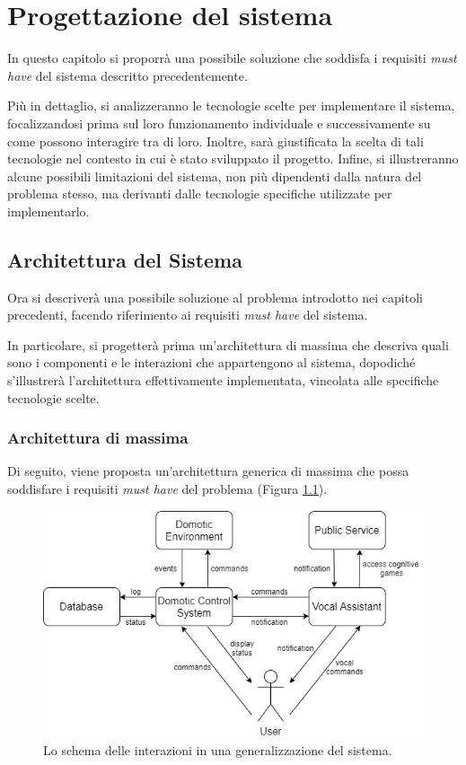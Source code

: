
\chapter{Progettazione del sistema}
\label{ch:Chapter3}

In questo capitolo si proporrà una possibile soluzione che soddisfa i requisiti
\textit{must have} del sistema descritto precedentemente.

Più in dettaglio, si analizzeranno le tecnologie scelte per implementare il
sistema, focalizzandosi prima sul loro funzionamento individuale e
successivamente su come possono interagire tra di loro. Inoltre, sarà
giustificata la scelta di tali tecnologie nel contesto in cui è stato
sviluppato il progetto. Infine, si illustreranno alcune possibili limitazioni
del sistema, non più dipendenti dalla natura del problema stesso, ma derivanti
dalle tecnologie specifiche utilizzate per implementarlo.

\section{Architettura del Sistema}
\label{sec:Sezione3.1}

Ora si descriverà una possibile soluzione al problema introdotto nei capitoli
precedenti, facendo riferimento ai requisiti \textit{must have} del sistema.

In particolare, si progetterà prima un’architettura di massima che descriva
quali sono i componenti e le interazioni che appartengono al sistema, dopodiché
s’illustrerà l’architettura effettivamente implementata, vincolata alle
specifiche tecnologie scelte.

\subsection{Architettura di massima}
\label{subsec:Sezione3.1.1}

Di seguito, viene proposta un’architettura generica di massima che possa
soddisfare i requisiti \textit{must have} del problema (Figura
\ref{fig:figure3.1}).

\begin{figure}[!ht]
  \centering
  \includegraphics[scale=0.7]{resources/images/design/system-structure-analysis-diagram.jpg}
  \caption{Lo schema delle interazioni in una generalizzazione del sistema.}
  \label{fig:figure3.1}
\end{figure}

